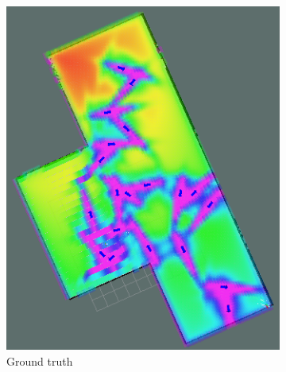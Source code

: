 \documentclass[a4paper,11pt]{report}
\begin{document}
	\begin{figure}[tbh]
	\hspace{5mm}
      \begin{subfigure}[b]{0.309\columnwidth}
    \includegraphics[width=1.\textwidth]{figures/gt_ct.png}
    \caption{Ground truth}
    \label{fig:get_cf}
  \end{subfigure}
  \begin{subfigure}[b]{0.30\columnwidth}

\end{subfigure}
\end{figure}
\end{document}

